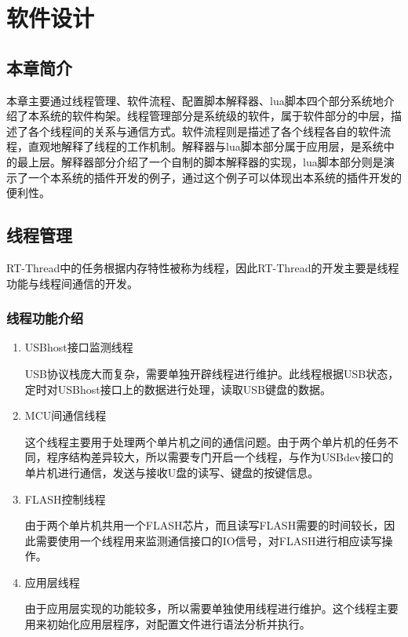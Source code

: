 
\chapter{软件设计}
\section{本章简介}
本章主要通过线程管理、软件流程、配置脚本解释器、lua脚本四个部分系统地介绍了本系统的软件构架。线程管理部分是系统级的软件，属于软件部分的中层，描述了各个线程间的关系与通信方式。软件流程则是描述了各个线程各自的软件流程，直观地解释了线程的工作机制。解释器与lua脚本部分属于应用层，是系统中的最上层。解释器部分介绍了一个自制的脚本解释器的实现，lua脚本部分则是演示了一个本系统的插件开发的例子，通过这个例子可以体现出本系统的插件开发的便利性。

\section{线程管理}
RT-Thread中的任务根据内存特性被称为线程，因此RT-Thread的开发主要是线程功能与线程间通信的开发。
\subsection{线程功能介绍}
\begin{enumerate}
\item USBhost接口监测线程

USB协议栈庞大而复杂，需要单独开辟线程进行维护。此线程根据USB状态，定时对USBhost接口上的数据进行处理，读取USB键盘的数据。

\item  MCU间通信线程

这个线程主要用于处理两个单片机之间的通信问题。由于两个单片机的任务不同，程序结构差异较大，所以需要专门开启一个线程，与作为USBdev接口的单片机进行通信，发送与接收U盘的读写、键盘的按键信息。

\item FLASH控制线程

由于两个单片机共用一个FLASH芯片，而且读写FLASH需要的时间较长，因此需要使用一个线程用来监测通信接口的IO信号，对FLASH进行相应读写操作。

\item  应用层线程

由于应用层实现的功能较多，所以需要单独使用线程进行维护。这个线程主要用来初始化应用层程序，对配置文件进行语法分析并执行。



\end{enumerate}




